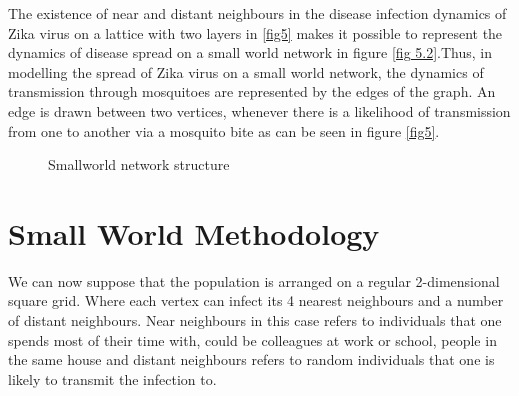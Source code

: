 The existence of near and distant neighbours in the disease infection dynamics of Zika virus on a lattice with two layers in \ref{fig5} makes it possible to represent the dynamics of disease spread on a small world network in figure \ref{fig 5.2}.Thus, in modelling the spread of Zika virus on a small world network, the dynamics of transmission through mosquitoes are represented by the edges of the graph. An edge is drawn between two vertices, whenever there is a likelihood of transmission from one to another via a mosquito bite as can be seen in figure \ref{fig5}.

\begin{figure}[h!]
\begin{minipage}[c]{1\textwidth}
 \centering
{}
\end{minipage}
\caption{Smallworld network structure} \label{fig 5.1}
\end{figure}
\section{Small World Methodology}

We  can now suppose that the population is arranged on a regular
2-dimensional square grid.  Where each vertex can infect its 4 nearest neighbours and a number of distant neighbours. Near neighbours in this case refers to individuals that one spends most of their time with, could be colleagues at work or school, people in the same house and distant neighbours refers to random individuals that one is likely to transmit the infection to. 
 
